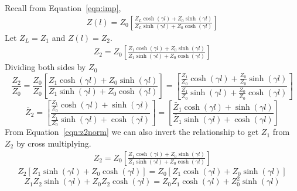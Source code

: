 Recall from Equation~\ref{eqn:imp},
\begin{align*}
Z(l) = Z_0\left[\frac{Z_L\cosh(\gamma l) + Z_0\sinh(\gamma l)}{Z_L\sinh(\gamma l) + Z_0\cosh(\gamma l)}\right]
\end{align*}
Let $Z_L = Z_1$ and $Z(l) = Z_2$.
\begin{align}
Z_2 = Z_0\left[\frac{Z_1\cosh(\gamma l) + Z_0\sinh(\gamma l)}{Z_1 \sinh(\gamma l) + Z_0 \cosh(\gamma l)}\right]
\label{eqn:z2norm}
\end{align}
Dividing both sides by $Z_0$
\begin{dmath*}
\frac{Z_2}{Z_0} = \frac{Z_0}{Z_0} \left[\frac{Z_1\cosh(\gamma l) + Z_0\sinh(\gamma l)}{Z_1 \sinh(\gamma l) + Z_0 \cosh(\gamma l)}\right]
= \left[\frac{\frac{Z_1}{Z_0}\cosh(\gamma l) + \frac{Z_0}{Z_0}\sinh(\gamma l)}{\frac{Z_1}{Z_0}\sinh(\gamma l) + \frac{Z_0}{Z_0}\cosh(\gamma l)}\right]
\end{dmath*}
\begin{dmath*}
\bar{Z}_2 = \left[\frac{\frac{Z_1}{Z_0}\cosh(\gamma l) + \sinh(\gamma l)}{\frac{Z_1}{Z_0}\sinh(\gamma l) + \cosh(\gamma l)}\right]
= \left[\frac{\bar{Z}_1\cosh(\gamma l) + \sinh(\gamma l)}{\bar{Z}_1\sinh(\gamma l) + \cosh(\gamma l)}\right]
\end{dmath*}
From Equation~\ref{eqn:z2norm} we can also invert the relationship to get $Z_1$ from $Z_2$ by cross multiplying.
\begin{align*}
Z_2 = Z_0\left[\frac{Z_1\cosh(\gamma l) + Z_0\sinh(\gamma l)}{Z_1 \sinh(\gamma l) + Z_0 \cosh(\gamma l)}\right]
\end{align*}
\begin{dmath*}
Z_2\left[Z_1\sinh(\gamma l) + Z_0\cosh(\gamma l)\right] = Z_0\left[Z_1\cosh(\gamma l) + Z_0\sinh(\gamma l)\right]
\end{dmath*}
\[Z_1Z_2\sinh(\gamma l) + Z_0Z_2\cosh(\gamma l) = Z_0Z_1\cosh(\gamma l) + Z_0^2\sinh(\gamma l)\]

